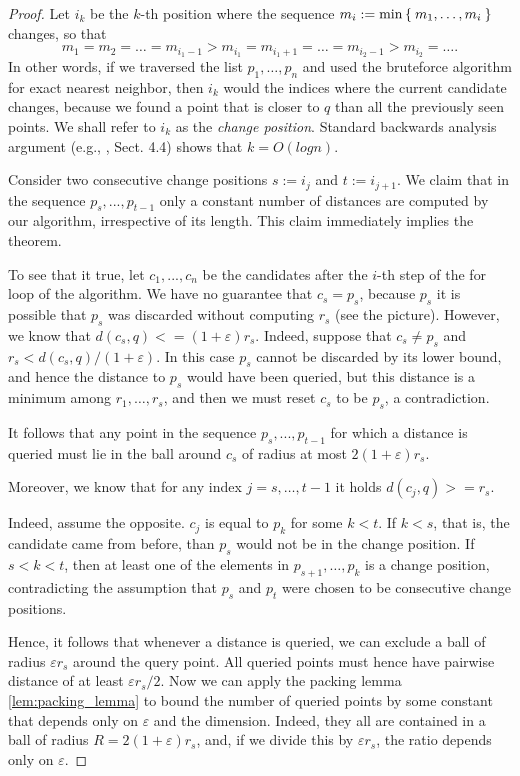 \documentclass[a4paper,USenglish]{socg-lipics-v2018}
\newcommand{\eps}{\varepsilon}
\begin{document}
\begin{proof}
Let $i_k$ be the {$k$-th} position where the sequence  $m_i := \min \Set{m_1, \dots, m_i}$
changes, so that
\[
m_1 = m_2 = \dots = m_{i_1 - 1} > m_{i_1} = m_{i_1 + 1} = \dots = m_{i_2 - 1} > m_{i_2} = \dots. 
\]
In other words, if we traversed the list $p_1, \dots, p_n$ and used the bruteforce algorithm
for exact nearest neighbor, then $i_k$ would the indices where the current candidate
changes, because we found a point that is closer to $q$ than all the previously seen points.
We shall refer to $i_k$ as the \textit{change position}.
Standard backwards analysis argument (e.g., \cite{dubch}, Sect. 4.4) shows that $k=O(log n)$.

    Consider two consecutive change positions $s:=i_j$ and $t:=i_{j+1}$. We claim that in the sequence
$p_s,...,p_{t-1}$
only a constant number of distances are computed by our algorithm, irrespective of its length. This claim immediately implies the theorem.

To see that it true, let $c_1,...,c_n$ be the candidates after the $i$-th step of
the for loop of the algorithm. We have no guarantee that $c_s=p_s$, because $p_s$ it is possible
    that $p_s$ was discarded without computing $r_s$ (see the picture). However, we know that
$d(c_s,q)<=(1+ \eps) r_s$.
Indeed, suppose that $c_s \neq p_s$ and $r_s < d(c_s,q)/(1+\eps)$. In this
    case $p_s$ cannot be discarded 
by its lower bound, and hence the distance to $p_s$ would
have been queried, but this distance is a minimum among $r_1, \dots, r_s$,
    and then we must reset $c_s$ to be $p_s$, a contradiction.

It follows that any point in the sequence $p_s,...,p_{t-1}$ for which a
distance is queried must lie in the ball around $c_s$ of radius at most $2(1+\eps)r_s$.

Moreover, we know that for any index $j=s,\dots, t-1$ it holds
$d(c_j,q)>=r_s$.

Indeed, assume the opposite. $c_j$ is equal to $p_k$ for some $k<t$. If $k<s$,
that is, the candidate came from before, than $p_s$ would not be in the
change position. If $s<k<t$, then at least one of the
elements in $p_{s+1},\dots,p_k$ is a change position, contradicting
the assumption that $p_s$ and $p_t$ were chosen to be consecutive change positions.

Hence, it follows that whenever a distance is queried, we can exclude a
ball of radius $\eps r_s$ around the query point. All queried points must
hence have pairwise distance of at least $ \eps r_s / 2$. 
Now we can apply the packing lemma \ref{lem:packing_lemma} to bound the number of
queried points by some constant that depends only on $\eps$ and the dimension. Indeed,
they all are contained in a ball of radius $R = 2(1+\eps)r_s$, and, if we divide this by $\eps r_s$, the ratio depends only on $\eps$.
\end{proof}
\end{document}
